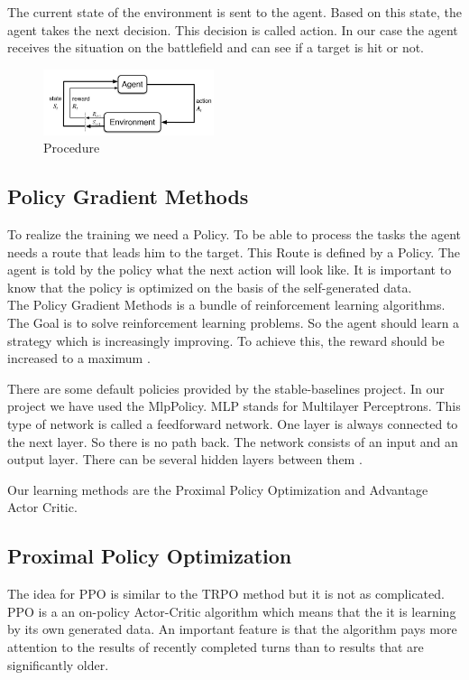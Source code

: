 \documentclass[sigconf]{acmart}
\begin{document}
The current state of the environment is sent to the agent. Based on this state, the agent takes the next decision.
This decision is called action. In our case the agent receives the situation on the battlefield and can see if a target is hit or not.


\begin{figure}[ht]
 \centering
 \includegraphics[width=50mm]{reinforcement-learning-fig1-700.jpg}
  \caption{Procedure}
  \label{fig:loss}
\end{figure}

\subsection{Policy Gradient Methods}
To realize the training we need a Policy. To be able to process the tasks the agent needs a route that leads him to the target.
This Route is defined by a Policy. The agent is told by the policy what the next action will look like.
It is important to know that the policy is optimized on the basis of the self-generated data.\\

The Policy Gradient Methods is a bundle of reinforcement learning algorithms. The Goal is to solve reinforcement learning problems.
So the agent should learn a strategy which is increasingly improving. To achieve this, the reward should be increased to a maximum \cite[16-18]{ravichandiran2018hands}.

There are some default policies provided by the stable-baselines project. 
In our project we have used the MlpPolicy. MLP stands for Multilayer Perceptrons.
This type of network is called a feedforward network.
One layer is always connected to the next layer. So there is no path back.
The network consists of an input and an output layer. There can be several hidden layers between them \cite[174]{Frochte.2019}.

Our learning methods are the Proximal Policy Optimization and Advantage Actor Critic.

\subsection{Proximal Policy Optimization}
The idea for PPO is similar to the TRPO method but it is not as complicated. 
PPO is a an on-policy Actor-Critic algorithm which means that the it is learning by its own generated data.
An important feature is that the algorithm pays more attention to the results of recently completed turns than to results that are significantly older.
\end{document}
